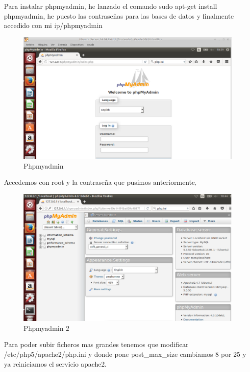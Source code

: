 Para instalar phpmyadmin, he lanzado el comando sudo apt-get install phpmyadmin, he puesto las contraseñas para las bases de datos y finalmente accedido con mi ip/phpmyadmin \cite{phpmyadmin}

	\begin{figure}[H]
	\centering
	\includegraphics[scale=0.35]{pics/phpAdmin.png}
	\caption{Phpmyadmin} \label{fig:php_my_Admin}
	\end{figure}

Accedemos con root y la contraseña que pusimos anteriormente,

	\begin{figure}[H]
	\centering
	\includegraphics[scale=0.35]{pics/php_my2.png}
	\caption{Phpmyadmin 2} \label{fig:php_my_Admin2}
\end{figure}

Para poder subir ficheros mas grandes tenemos que modificar /etc/php5/apache2/php.ini y donde pone post\_max\_size cambiamos 8 por 25 y ya reiniciamos el servicio apache2.

